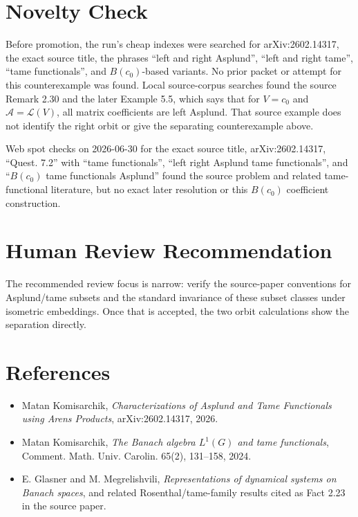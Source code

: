 \documentclass[11pt]{article}
\newcommand{\A}{\mathcal A}
\begin{document}
\section*{Novelty Check}

Before promotion, the run's cheap indexes were searched for arXiv:2602.14317,
the exact source title, the phrases ``left and right Asplund'', ``left and
right tame'', ``tame functionals'', and \(B(c_0)\)-based variants.  No prior
packet or attempt for this counterexample was found.  Local source-corpus
searches found the source Remark 2.30 and the later Example 5.5, which says
that for \(V=c_0\) and \(\A=\mathcal L(V)\), all matrix coefficients are left
Asplund.  That source example does not identify the right orbit or give the
separating counterexample above.

Web spot checks on 2026-06-30 for the exact source title, arXiv:2602.14317,
``Quest. 7.2'' with ``tame functionals'', ``left right Asplund tame
functionals'', and ``\(B(c_0)\) tame functionals Asplund'' found the source
problem and related tame-functional literature, but no exact later resolution
or this \(B(c_0)\) coefficient construction.

\section*{Human Review Recommendation}

The recommended review focus is narrow: verify the source-paper conventions
for Asplund/tame subsets and the standard invariance of these subset classes
under isometric embeddings.  Once that is accepted, the two orbit calculations
show the separation directly.

\section*{References}

\begin{itemize}
\item Matan Komisarchik, \emph{Characterizations of Asplund and Tame
Functionals using Arens Products}, arXiv:2602.14317, 2026.
\item Matan Komisarchik, \emph{The Banach algebra \(L^1(G)\) and tame
functionals}, Comment. Math. Univ. Carolin. 65(2), 131--158, 2024.
\item E. Glasner and M. Megrelishvili, \emph{Representations of dynamical
systems on Banach spaces}, and related Rosenthal/tame-family results cited as
Fact 2.23 in the source paper.
\end{itemize}
\end{document}
